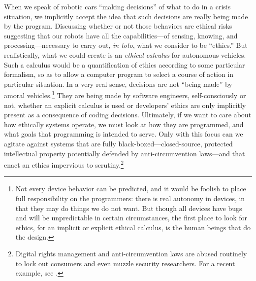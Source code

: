 
When we
speak of robotic cars ``making decisions'' of what to do in a crisis
situation, we implicitly accept the idea that such decisions are
really being made by the program. Discussing whether or not those
behaviors are ethical risks suggesting that our robots have all the
capabilities---of sensing, knowing, and processing---necessary to
carry out, \emph{in toto}, what we consider to be ``ethics.'' But
realistically, what we could create is an \emph{ethical calculus} for 
autonomous vehicles. Such a calculus would be a quantification of
ethics according to some particular formalism, so as to allow a
computer program to select a course of action in particular
situation. In a very real sense, decisions are not
``being made'' by amoral vehicles.\footnote{Not every device behavior
can be predicted, and it would be foolish to place full responsibility
on the programmers: there is real autonomy in devices, in that they
may do things we do not want. But though all devices have bugs and
will be unpredictable in certain circumstances, the first place to
look for ethics, for an implicit or explicit ethical calculus, is the
human beings 
that do the design.} They are being made by software engineers,
self-consciously or not, whether an
explicit calculus is used or developers' ethics are only
implicitly present as a consequence of coding decisions. Ultimately,
if we want to care about how ethically systems
operate, we must look at how they are programmed, and what goals that
programming is intended to serve. Only with this focus can we agitate
against systems that are fully black-boxed---closed-source, protected
intellectual property potentially defended by anti-circumvention
laws---and that enact an ethics impervious to scrutiny.\footnote{Digital
  rights management and anti-circumvention laws are abused routinely
  to lock out consumers and even muzzle security researchers. For a
  recent example, see \cite{higgins}.
}



